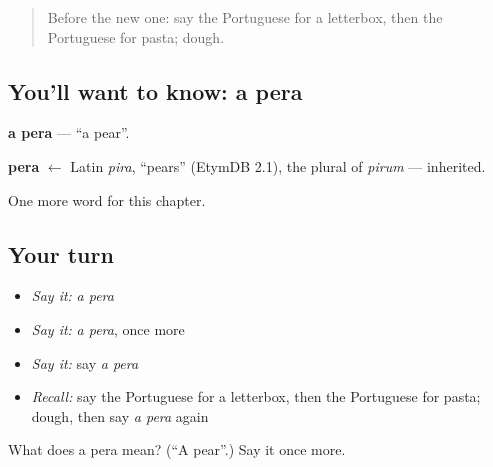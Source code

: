 \label{lesson:PT-C99-pera}



\begin{quote}
Before the new one: say the Portuguese for a letterbox, then the Portuguese for pasta; dough.
\end{quote}

\subsection*{You'll want to know: a pera}
\textbf{a pera} — \textquotedblleft{}a pear\textquotedblright{}.

\begin{cousinweb}
\textbf{pera} $\leftarrow$ Latin \emph{pira}, \textquotedblleft{}pears\textquotedblright{} (EtymDB 2.1), the plural of \emph{pirum} — inherited.
\end{cousinweb}

\begin{grammarlens}[title={What you've built}]
One more word for this chapter.
\end{grammarlens}

\subsection*{Your turn}
\begin{itemize}
\raggedright
  \item \emph{Say it:} \emph{a pera}
  \item \emph{Say it:} \emph{a pera}, once more
  \item \emph{Say it:} say \emph{a pera}
  \item \emph{Recall:} say the Portuguese for a letterbox, then the Portuguese for pasta; dough, then say \emph{a pera} again
\end{itemize}

\begin{tcolorbox}[breakable,colback=teal!4,colframe=teal!35!black,title={Before you move on}]
What does a pera mean? (\textquotedblleft{}A pear\textquotedblright{}.) Say it once more.
\end{tcolorbox}
